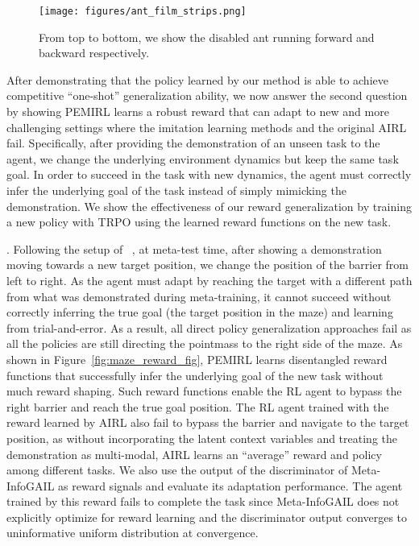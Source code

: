 \begin{figure*}[!t]
    \centering
    \texttt{[image: figures/ant\_film\_strips.png]}
\caption{From top to bottom, we show the disabled ant running forward and backward respectively.
    }
\label{fig:ant_film_strips}
\end{figure*}

After demonstrating that the policy learned by our method is able to achieve competitive ``one-shot'' generalization ability, we now answer the second question by showing PEMIRL learns a robust reward that can adapt to new and more challenging settings where the imitation learning methods and the original AIRL fail. Specifically, after providing the demonstration of an unseen task to the agent, we change the underlying environment dynamics but keep the same task goal. In order to succeed in the task with new dynamics, the agent must correctly infer the underlying goal of the task instead of simply mimicking the demonstration. We show the effectiveness of our reward generalization by training a new policy with TRPO using the learned reward functions on the new task.

. Following the setup of ~\citet{fu2017learning}, at meta-test time, after showing a demonstration moving towards a new target position, we change the position of the barrier from left to right. 
As the agent must adapt by reaching the target with a different path from what was demonstrated during meta-training, it cannot succeed without correctly inferring the true goal (the target position in the maze) and learning from trial-and-error. As a result, all direct policy generalization approaches fail as all the policies are still directing the pointmass to the right side of the maze. As shown in Figure~\ref{fig:maze_reward_fig}, PEMIRL learns disentangled reward functions that successfully infer the underlying goal of the new task without much reward shaping. Such reward functions enable the RL agent to bypass the right barrier and reach the true goal position. The RL agent trained with the reward learned by AIRL also fail to bypass the barrier and
navigate to the target position, as without incorporating the latent context variables and treating the demonstration as multi-modal, AIRL learns an ``average'' reward and policy among different tasks. We also use the output of the discriminator of Meta-InfoGAIL as reward signals and evaluate its adaptation performance. The agent trained by this reward fails to complete the task since Meta-InfoGAIL does not explicitly optimize for reward learning and the discriminator output converges to uninformative uniform distribution at convergence.


